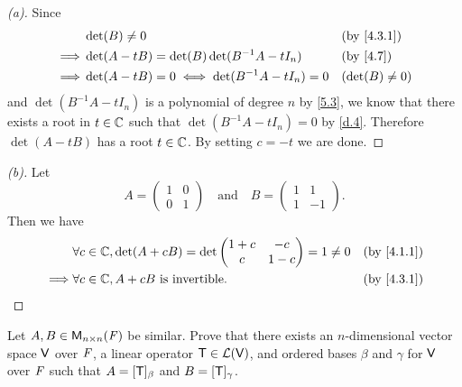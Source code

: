 \begin{proof}[(a)]
  Since
  \begin{align*}
             & \det(B) \neq 0                                   &  & \by{4.3.1}       \\
    \implies & \det(A - tB) = \det(B) \det(B^{-1} A - t I_n)    &  & \by{4.7}         \\
    \implies & \det(A - tB) = 0 \iff \det(B^{-1} A - t I_n) = 0 &  & (\det(B) \neq 0)
  \end{align*}
  and \(\det(B^{-1} A - t I_n)\) is a polynomial of degree \(n\) by \cref{5.3}, we know that there exists a root in \(t \in \mathbb{C}\) such that \(\det(B^{-1} A - t I_n) = 0\) by \cref{d.4}.
  Therefore \(\det(A - tB)\) has a root \(t \in \mathbb{C}\).
  By setting \(c = -t\) we are done.
\end{proof}

\begin{proof}[(b)]
  Let
  \[
    A = \begin{pmatrix}
      1 & 0 \\
      0 & 1
    \end{pmatrix} \quad \text{and} \quad B = \begin{pmatrix}
      1 & 1  \\
      1 & -1
    \end{pmatrix}.
  \]
  Then we have
  \begin{align*}
             & \forall c \in \C, \det(A + cB) = \det\begin{pmatrix}
                                                      1 + c & -c    \\
                                                      c     & 1 - c
                                                    \end{pmatrix} = 1 \neq 0 &  & \by{4.1.1} \\
    \implies & \forall c \in \C, A + cB \text{ is invertible}.      &  & \by{4.3.1}
  \end{align*}
\end{proof}

\begin{ex}\label{ex:5.1.19}
  Let \(A, B \in \ms[n][n][\F]\) be similar.
  Prove that there exists an \(n\)-dimensional vector space \(\mathsf{V}\) over \(\mathit{F}\), a linear operator \(\mathsf{T} \in \mathcal{L}(\mathsf{V})\), and ordered bases \(\beta\) and \(\gamma\) for \(\mathsf{V}\) over \(\mathit{F}\) such that \(A = [\mathsf{T}]_{\beta}\) and \(B = [\mathsf{T}]_{\gamma}\).
\end{ex}

